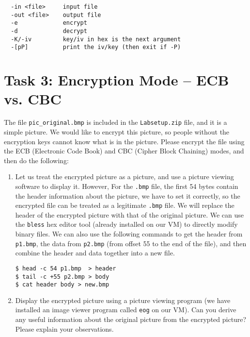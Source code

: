 \begin{lstlisting}
  -in <file>     input file
  -out <file>    output file
  -e             encrypt
  -d             decrypt
  -K/-iv         key/iv in hex is the next argument
  -[pP]          print the iv/key (then exit if -P)
\end{lstlisting}




\section{Task 3: Encryption Mode -- ECB vs. CBC} 

The file {\tt pic\_original.bmp} is included in the 
\texttt{Labsetup.zip} file, and it is a simple picture. 
We would like to encrypt this picture, so people without the 
encryption keys cannot know what is in the picture. Please 
encrypt the file using the ECB (Electronic Code Book)  
and CBC (Cipher Block Chaining) modes, and then do the following: 

\begin{enumerate}
\item Let us treat the encrypted picture as 
a picture, and use a picture viewing software to display it. However,
For the {\tt .bmp} file, the first 54 bytes contain the header information 
about the picture, we have to set it correctly, so 
the encrypted file can be treated as a legitimate {\tt .bmp} file.
We will replace the header of the encrypted picture 
with that of the original picture. We can use 
the \texttt{bless} hex editor tool (already installed 
on our VM) to directly modify binary files. We can also use the 
following commands to get the header from \texttt{p1.bmp},
the data from \texttt{p2.bmp} (from offset 55 to the end of the file), 
and then combine the header and data
together into a new file.

\begin{lstlisting}
$ head -c 54 p1.bmp  > header
$ tail -c +55 p2.bmp > body
$ cat header body > new.bmp
\end{lstlisting}


\item Display the encrypted picture using a picture 
viewing program (we have installed an image viewer program called
\texttt{eog} on our VM). 
Can you derive any useful information
about the original picture from the encrypted picture?
Please explain your observations.

\end{enumerate}

